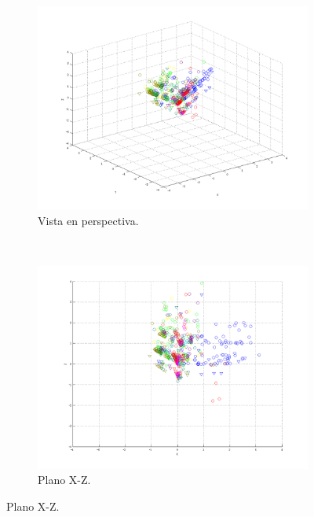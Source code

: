 \documentclass[informe.tex]{subfiles}
\begin{document}
      
	\begin{figure}[H]
        \centering
        \hspace*{-6.5cm}
        \begin{subfigure}[b]{0.49\textwidth}
                \includegraphics[width=\textwidth]{graficos/fold7_criterioParadao_reglaM_alpha0_rep4_0P.png}
                \caption{Vista en perspectiva.}
        \end{subfigure}%
        ~
        \begin{subfigure}[b]{0.49\textwidth}
                \includegraphics[width=\textwidth]{graficos/fold7_criterioParadao_reglaM_alpha0_rep4_1XZ.png}
                \caption{Plano X-Z.}
        \end{subfigure}
        

\end{figure}
\end{document}
